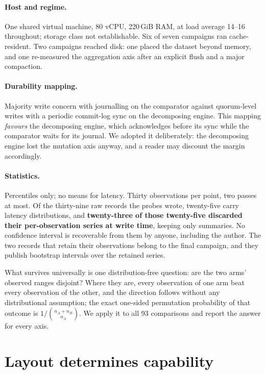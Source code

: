 \documentclass[11pt,a4paper]{article}
\begin{document}
\paragraph{Host and regime.} One shared virtual machine, 80 vCPU, 220\,GiB RAM, at load average
14--16 throughout; storage class not establishable. Six of seven campaigns ran cache-resident. Two
campaigns reached disk: one placed the dataset beyond memory, and one re-measured the aggregation
axis after an explicit flush and a major compaction.

\paragraph{Durability mapping.} Majority write concern with journalling on the comparator against
quorum-level writes with a periodic commit-log sync on the decomposing engine. This mapping
\emph{favours} the decomposing engine, which acknowledges before its sync while the comparator
waits for its journal. We adopted it deliberately: the decomposing engine lost the mutation axis
anyway, and a reader may discount the margin accordingly.

\paragraph{Statistics.} Percentiles only; no means for latency. Thirty observations per point, two
passes at most. Of the thirty-nine raw records the probes wrote, twenty-five carry latency
distributions, and \textbf{twenty-three of those twenty-five discarded their per-observation series
at write time}, keeping only summaries. No confidence interval is recoverable from them by anyone,
including the author. The two records that retain their observations belong to the final campaign,
and they publish bootstrap intervals over the retained series.

What survives universally is one distribution-free question: are the two arms' observed ranges
disjoint? Where they are, every observation of one arm beat every observation of the other, and the
direction follows without any distributional assumption; the exact one-sided permutation
probability of that outcome is $1 / \binom{n_A + n_B}{n_A}$. We apply it to all 93 comparisons and
report the answer for every axis.

\section{Layout determines capability}
\label{sec:capability}
\end{document}
